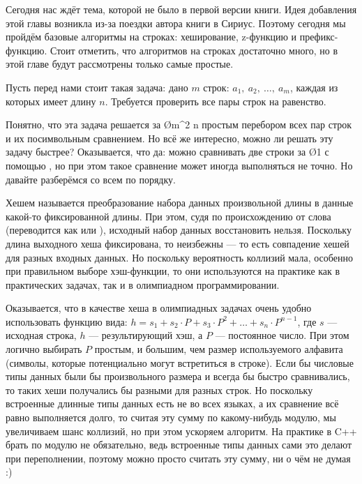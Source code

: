 Сегодня нас ждёт тема, которой не было в первой версии книги. Идея добавления этой главы возникла из-за поездки автора книги в Сириус. Поэтому сегодня мы пройдём базовые алгоритмы на строках: хеширование, z-функцию и префикс-функцию. Стоит отметить, что алгоритмов на строках достаточно много, но в этой главе будут рассмотрены только самые простые.


Пусть перед нами стоит такая задача: дано $m$ строк: $a_1,\ a_2,\ \ldots,\ a_m$, каждая из которых имеет длину $n$. Требуется проверить все пары строк на равенство.

Понятно, что эта задача решается за \O{m^2 \cdot n} простым перебором всех пар строк и их посимвольным сравнением. Но всё же интересно, можно ли решать эту задачу быстрее? Оказывается, что да: можно сравнивать две строки за \O{1} с помощью , но при этом такое сравнение может иногда выполняться не точно. Но давайте разберёмся со всем по порядку.

Хешем называется преобразование набора данных произвольной длины в данные какой-то фиксированной длины. При этом, судя по происхождению от слова  (переводится как  или ), исходный набор данных восстановить нельзя. Поскольку длина выходного хеша фиксирована, то неизбежны  — то есть совпадение хешей для разных входных данных. Но поскольку вероятность коллизий мала, особенно при правильном выборе хэш-функции, то они используются на практике как в практических задачах, так и в олимпиадном программировании.

Оказывается, что в качестве хеша в олимпиадных задачах очень удобно использовать функцию вида: $h = s_1 + s_2 \cdot P + s_3 \cdot P^2 + \ldots + s_n \cdot P^{n - 1}$, где $s$ — исходная строка, $h$ — результирующий хэш, а $P$ — постоянное число. При этом логично выбирать $P$ простым, и большим, чем размер используемого алфавита (символы, которые потенциально могут встретиться в строке). Если бы числовые типы данных были бы произвольного размера и всегда бы быстро сравнивались, то таких хеши получались бы разными для разных строк. Но поскольку встроенные длинные типы данных есть не во всех языках, а их сравнение всё равно выполняется долго, то считая эту сумму по какому-нибудь модулю, мы увеличиваем шанс коллизий, но при этом ускоряем алгоритм. На практике в C++ брать по модулю не обязательно, ведь встроенные типы данных сами это делают при переполнении, поэтому можно просто считать эту сумму, ни о чём не думая :)


